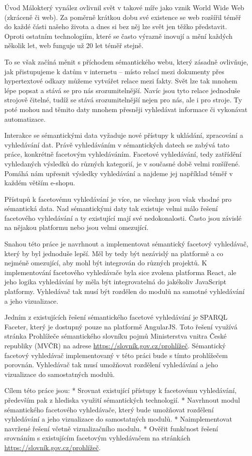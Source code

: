 \chap Úvod
Málokterý vynález ovlivnil svět v takové míře jako vznik World Wide Web (zkráceně  či web). 
Za poměrně krátkou dobu své existence se web rozšířil téměř do každé části našeho života a dnes si bez něj lze svět jen těžko představit. 
Oproti ostatním  technologiím, které se často výrazně inovují a mění každých několik let, web funguje už 20 let téměř stejně.

To se však začíná měnit s příchodem sémantického webu, který zásadně ovlivňuje, jak přistupujeme k datům v internetu – místo relací mezi dokumenty přes hypertextové odkazy můžeme vytvářet relace mezi fakty. 
Svět lze tak mnohem lépe popsat a stává se pro nás srozumitelnější. 
Navíc jsou tyto relace jednoduše strojově čitelné, tudíž se stává srozumitelnější nejen pro nás, ale i pro stroje. 
Ty poté mohou nad těmito daty mnohem přesněji vyhledávat informace či vykonávat automatizace. 

Interakce se sémantickými data vyžaduje nové přístupy k ukládání, zpracování a vyhledávání dat. 
Právě vyhledáváním v sémantických datech se zabývá tato práce, konkrétně facetovým vyhledáváním. 
Facetové vyhledávání, tedy zatřídění vyhledaných výsledků do různých kategorií, je v současné době velmi rozšířené. 
Pomáhá nám upřesnit výsledky vyhledávání a najdeme jej například téměř v každém větším e-shopu. 

Přístupů k facetovému vyhledávání je více, ne všechny jsou však vhodné pro sémantická data. 
Nad sémantickými daty tak existuje velmi málo řešení facetového vyhledávání a ty existující mají své nedokonalosti.
Často jsou závislé na nějakou platformu nebo jsou velmi omezující.

Snahou této práce je navrhnout a implementovat sémantický facetový vyhledávač, který by byl jednoduše lepší.
Měl by tedy být nezávislý na platformě a co nejméně omezující, aby mohl být integrován do různých projektů.
K implementování facetového vyhledávače byla sice zvolena platforma React, ale jeho logika vyhledávání by měla být integrovatelná do jakékoliv JavaScript platformy.
Vyhledávač tak musí být rozdělen do modulů na samotné vyhledávání a jeho vizualizace.

Jedním z existujících řešení sémantického facetové vyhledávání je SPARQL Faceter, který je dostupný pouze na platformě AngularJS.
Toto řešení využívá stránka Prohlížeče sémantického slovníku pojmů Ministerstva vnitra České republiky (MVČR) na adrese \url{https://slovník.gov.cz/prohlížeč}.
Sémantický facetový vyhledávač implementovaný v této práci bude s tímto prohlížečem porovnán.
Vyhledávač tak musí umožňovat rozdělení vyhledávání a jeho vizualizace do samostatných modulů.
\nl\nl

\midinsert
Cílem této práce jsou:
\begitems
* Srovnat existující přístupy k facetovému vyhledávání, především pak z hlediska využití sémantických technologií.
* Navrhnout modul sémantického facetového vyhledávače, který bude umožňovat rozdělení vyhledávání a jeho vizualizace do samostatných modulů.
* Naimplementovat navržené řešení včetně vizualizačního modulu.
* Ověřit funkčnost řešení srovnáním s existujícím facetovým vyhledávačem na stránkách \url{https://slovník.gov.cz/prohlížeč}.
\enditems
\endinsert
